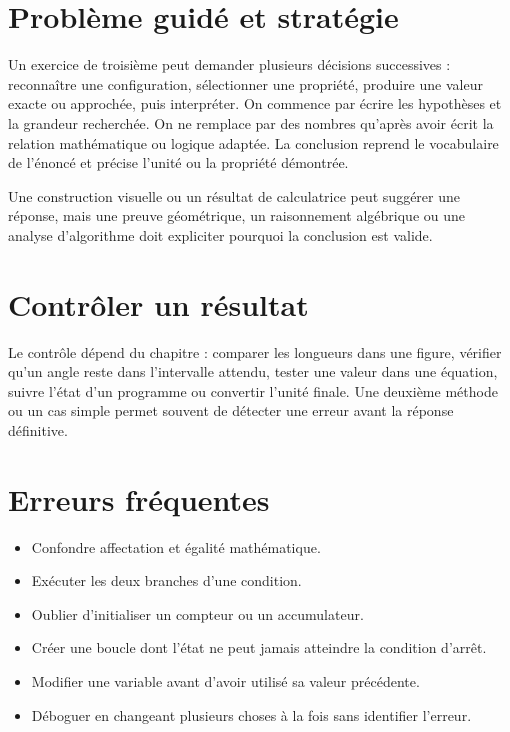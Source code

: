 \section{Problème guidé et stratégie}
Un exercice de troisième peut demander plusieurs décisions successives : reconnaître une configuration, sélectionner une propriété, produire une valeur exacte ou approchée, puis interpréter. On commence par écrire les hypothèses et la grandeur recherchée. On ne remplace par des nombres qu’après avoir écrit la relation mathématique ou logique adaptée. La conclusion reprend le vocabulaire de l’énoncé et précise l’unité ou la propriété démontrée.

\begin{attention}
Une construction visuelle ou un résultat de calculatrice peut suggérer une réponse, mais une preuve géométrique, un raisonnement algébrique ou une analyse d’algorithme doit expliciter pourquoi la conclusion est valide.
\end{attention}

\section{Contrôler un résultat}
Le contrôle dépend du chapitre : comparer les longueurs dans une figure, vérifier qu’un angle reste dans l’intervalle attendu, tester une valeur dans une équation, suivre l’état d’un programme ou convertir l’unité finale. Une deuxième méthode ou un cas simple permet souvent de détecter une erreur avant la réponse définitive.

\section{Erreurs fréquentes}
\begin{itemize}
\item Confondre affectation et égalité mathématique.
\item Exécuter les deux branches d’une condition.
\item Oublier d’initialiser un compteur ou un accumulateur.
\item Créer une boucle dont l’état ne peut jamais atteindre la condition d’arrêt.
\item Modifier une variable avant d’avoir utilisé sa valeur précédente.
\item Déboguer en changeant plusieurs choses à la fois sans identifier l’erreur.
\end{itemize}

